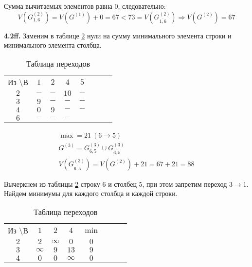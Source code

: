 Сумма вычитаемых элементов равна $0$, следовательно:
\begin{equation*}
V(G_{1,6}^{(2)}) = V(G^{(1)}) + 0 = 67 < 73 = V(G_{\overline{1,6}}^{(2)})\Rightarrow V(G^{(2)}) = 67
\end{equation*}

\textbf{4.2ff.} Заменим в таблице \ref{tab:112} нули на сумму минимального элемента строки и минимального элемента столбца. 

\begin{table}[H]
\begin{center}
	\def\tabcolsep{15pt}
	\caption{Таблица переходов}
	\label{tab:112}
	\begin{tabular}{|c||c|c|c|c|c|c|c|}
		\hline
		Из \textbackslash В & $1$ & $2$ & $4$ & $5$ \\
		\hhline{|=#=|=|=|=|=|=|}
		$2$ & $-$ & $-$ & $10$ & $-$ \\
		\hline
		$3$ & $9$ & $-$ & $-$ & $-$ \\ 
		\hline
		$4$ & $0$ & $9$ & $-$ & $-$ \\
		\hline
		$6$ & $-$ & $-$ & $-$ & \redbold{$21$} \\
		\hline
	\end{tabular}
\end{center}
\end{table}

\begin{gather*}
\max = 21\ (6 \rightarrow 5) \\
G^{(3)} = G_{6,5}^{(3)} \cup G_{\overline{6,5}}^{(3)} \\
V(G_{\overline{6,5}}^{(3)}) = V(G^{(2)}) + 21 = 67 + 21 = 88
\end{gather*}

Вычеркнем из таблицы \ref{tab:112} строку $6$ и столбец $5$, при этом запретим переход $3 \rightarrow 1$. Найдем минимумы для каждого столбца и каждой строки.

\begin{table}[H]
\begin{center}
	\def\tabcolsep{15pt}
	\caption{Таблица переходов}
	\label{tab:112}
	\begin{tabular}{|c||c|c|c|c|c|c|c|}
		\hline
		Из \textbackslash В & $1$ & $2$ & $4$ & $\min$ \\
		\hhline{|=#=|=|=|=|}
		$2$ & $2$ & $\infty$ & $0$ & $0$ \\
		\hline
		$3$ & $\infty$ & $9$ & $13$ & $9$  \\ 
		\hline
		$4$ & $0$ & $0$ & $\infty$ & $0$  \\
		\hline
	\end{tabular}
\end{center}
\end{table}

